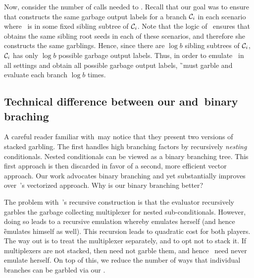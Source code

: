 Now, consider the number of calls needed to \Ev.  Recall that our
goal was to ensure that \E constructs the same garbage output labels
for a branch $\mathcal C_i$ in each scenario where \aid\ is in some fixed
sibling subtree of $\mathcal C_i$. Note that the logic of \gadget\ ensures
that \E obtains the same sibling root seeds in each of these
scenarios, and therefore she constructs the same garblings. Hence,
since there are $\log b$ sibling subtrees of $\mathcal C_i$, $\mathcal C_i$ has
only $\log b$ possible garbage output labels.
Thus, in order to emulate \E\ in all settings and obtain all possible
garbage output labels, \G\ must garble and evaluate each branch $\log b$ times.


\subsection{Technical difference between our and~\HK binary braching}
\label{sec:techOverviewDiff}

A careful reader familiar with~\HK may notice that they present two
versions of stacked garbling.
The first handles high branching factors by recursively \emph{nesting}
conditionals.
Nested conditionals can be viewed as a binary branching
tree.
This first approach is then discarded in favor of a second, more efficient vector approach.
Our work advocates binary branching and yet substantially improves
over~\HK's vectorized approach.
Why is our binary branching better?

The problem with~\HK's recursive construction
is that the evaluator \E recursively garbles the garbage collecting multiplexer for
nested sub-conditionals.
However, doing so leads to a recursive emulation whereby \E
emulates herself (and hence \G emulates himself as well).
This recursion leads to quadratic cost for both players.
The way out is to treat the multiplexer separately, and to opt not
to stack it.
If multiplexers are not stacked, then \E need not garble them, and
hence \E\ need never emulate herself.
On top of this, we reduce the number of ways that individual branches
can be garbled via our \gadget.

